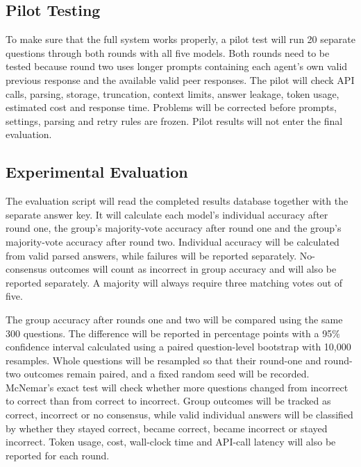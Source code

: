 \documentclass[12pt,a4paper]{article}
\begin{document}
\subsection{Pilot Testing}

To make sure that the full system works properly, a pilot test will run 20
separate questions through both rounds with all five models. Both rounds need
to be tested because round two uses longer prompts containing each agent's own
valid previous response and the available valid peer responses. The pilot will
check API calls, parsing, storage, truncation, context limits, answer leakage,
token usage, estimated cost and response time. Problems will be corrected
before prompts, settings, parsing and retry rules are frozen. Pilot results
will not enter the final evaluation.

\subsection{Experimental Evaluation}

The evaluation script will read the completed results database together with
the separate answer key. It will calculate each model's individual accuracy
after round one, the group's majority-vote accuracy after round one and the
group's majority-vote accuracy after round two. Individual accuracy will be
calculated from valid parsed answers, while failures will be reported
separately. No-consensus outcomes will count as incorrect in group accuracy and
will also be reported separately. A majority will always require three matching
votes out of five.

The group accuracy after rounds one and two will be compared using the same 300
questions. The difference will be reported in percentage points with a 95\%
confidence interval calculated using a paired question-level bootstrap with
10,000 resamples. Whole questions will be resampled so that their round-one and
round-two outcomes remain paired, and a fixed random seed will be recorded.
McNemar's exact test will check whether more questions changed from incorrect
to correct than from correct to incorrect. Group outcomes will be tracked as
correct, incorrect or no consensus, while valid individual answers will be
classified by whether they stayed correct, became correct, became incorrect or
stayed incorrect. Token usage, cost, wall-clock time and API-call latency will
also be reported for each round.


\end{document}
